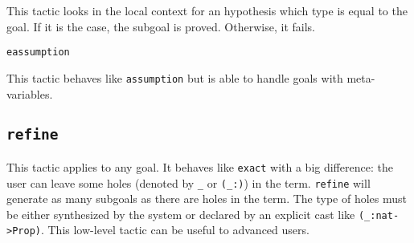 This tactic looks in the local context for an
hypothesis which type is equal to the goal.  If it is the case, the
subgoal is proved. Otherwise, it fails.

\begin{ErrMsgs}
\item  {}
\end{ErrMsgs}

\begin{Variants}
  \item \texttt{eassumption}

    This tactic behaves like \texttt{assumption} but is able to handle
    goals with meta-variables.

\end{Variants}

\subsection{\tt refine \term}
\label{refine}
\label{refine-example}

This tactic applies to any goal. It behaves like {\tt exact} with a big
difference: the user can leave some holes (denoted by \texttt{\_} or
{\tt (\_:\type)}) in the term. {\tt refine} will generate as
many subgoals as there are holes in the term. The type of holes must be
either synthesized by the system or declared by an
explicit cast like \verb|(_:nat->Prop)|. This low-level
tactic can be useful to advanced users.

\Example

